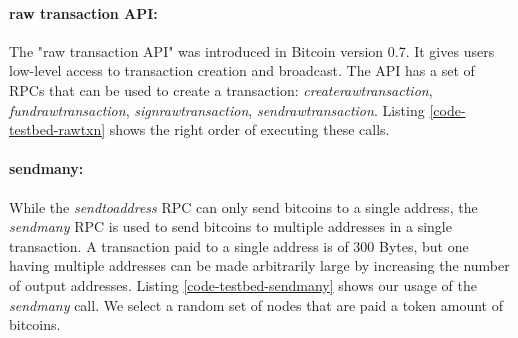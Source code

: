 
\paragraph{raw transaction API: } 

The "raw transaction API" was introduced in Bitcoin version 0.7. It gives users low-level access to transaction creation and broadcast. The API has a set of RPCs that can be used to create a transaction: \textit{createrawtransaction}, \textit{fundrawtransaction}, \textit{signrawtransaction}, \textit{sendrawtransaction}. Listing \ref{code-testbed-rawtxn} shows the right order of executing these calls.


\paragraph{sendmany: } 

While the \textit{sendtoaddress} RPC can only send bitcoins to a single address, the \textit{sendmany} RPC is used to send bitcoins to multiple addresses in a single transaction. A transaction paid to a single address is of 300 Bytes, but one having multiple addresses can be made arbitrarily large by increasing the number of output addresses. Listing \ref{code-testbed-sendmany} shows our usage of the \textit{sendmany} call. We select a random set of nodes that are paid a token amount of bitcoins. 

